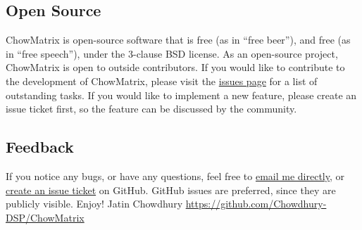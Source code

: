 \documentclass[landscape,twocolumn,a5paper]{manual}
\begin{document}
\subsection{Open Source}
ChowMatrix is open-source software that is free (as in ``free
beer''), and free (as in ``free speech''), under the
3-clause BSD license. As an open-source project, ChowMatrix is
open to outside contributors. If you would like to contribute
to the development of ChowMatrix, please visit the
\href{https://github.com/Chowdhury-DSP/ChowMatrix/issues}{issues page}
for a list of outstanding tasks. If you would like to implement
a new feature, please create an issue ticket first, so the
feature can be discussed by the community.

\subsection{Feedback}
If you notice any bugs, or have any questions, feel free
to \href{mailto:chowdsp@gmail.com}{email me directly},
or \href{https://github.com/Chowdhury-DSP/ChowMatrix/issues}{create an issue ticket}
on GitHub. GitHub issues are preferred, since they are publicly
visible.
\newpar
Enjoy!
\newpar
Jatin Chowdhury
\newpar
\href{https://github.com/Chowdhury-DSP/ChowMatrix}{https://github.com/Chowdhury-DSP/ChowMatrix}
\end{document}
